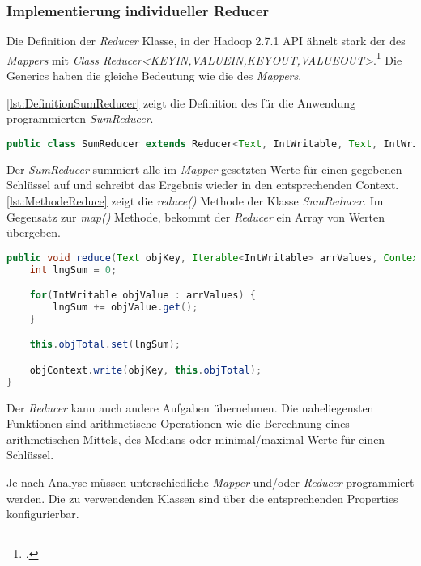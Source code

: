 \newpage
\subsubsection{Implementierung individueller Reducer}
Die Definition der \textit{Reducer} Klasse, in der Hadoop 2.7.1 \ac{API} ähnelt stark der des \textit{Mappers} mit \textit{Class Reducer<KEYIN,VALUEIN,KEYOUT,VALUEOUT>}.\footcite[Vgl.][]{ApacheHadoopApiDokuReducer.2015} Die Generics haben die gleiche Bedeutung wie die des \textit{Mappers}.

\autoref{lst:DefinitionSumReducer} zeigt die Definition des für die Anwendung programmierten \textit{SumReducer}.  \\

\begin{lstlisting}[language=Java,caption=Deklaration \textit{SumReducer} mit Generics,label=lst:DefinitionSumReducer]
public class SumReducer extends Reducer<Text, IntWritable, Text, IntWritable>
\end{lstlisting}

Der \textit{SumReducer} summiert alle im \textit{Mapper} gesetzten Werte für einen gegebenen Schlüssel auf und schreibt das Ergebnis wieder in den entsprechenden Context. \autoref{lst:MethodeReduce} zeigt die \textit{reduce()} Methode der Klasse \textit{SumReducer}. Im Gegensatz zur \textit{map()} Methode, bekommt der \textit{Reducer} ein Array von Werten übergeben. \\

\begin{lstlisting}[language=Java,caption=Methode \textit{reduce()} der Klasse \textit{SumReducer},label=lst:MethodeReduce]
public void reduce(Text objKey, Iterable<IntWritable> arrValues, Context objContext) throws IOException, InterruptedException {
	int lngSum = 0;

	for(IntWritable objValue : arrValues) {
		lngSum += objValue.get();
	}

	this.objTotal.set(lngSum);

	objContext.write(objKey, this.objTotal);
}
\end{lstlisting}

Der \textit{Reducer} kann auch andere Aufgaben übernehmen. Die naheliegensten Funktionen sind arithmetische Operationen wie die Berechnung eines arithmetischen Mittels, des Medians oder minimal/maximal Werte für einen Schlüssel.

Je nach Analyse müssen unterschiedliche \textit{Mapper} und/oder \textit{Reducer} programmiert werden. Die zu verwendenden Klassen sind über die entsprechenden Properties konfigurierbar.


